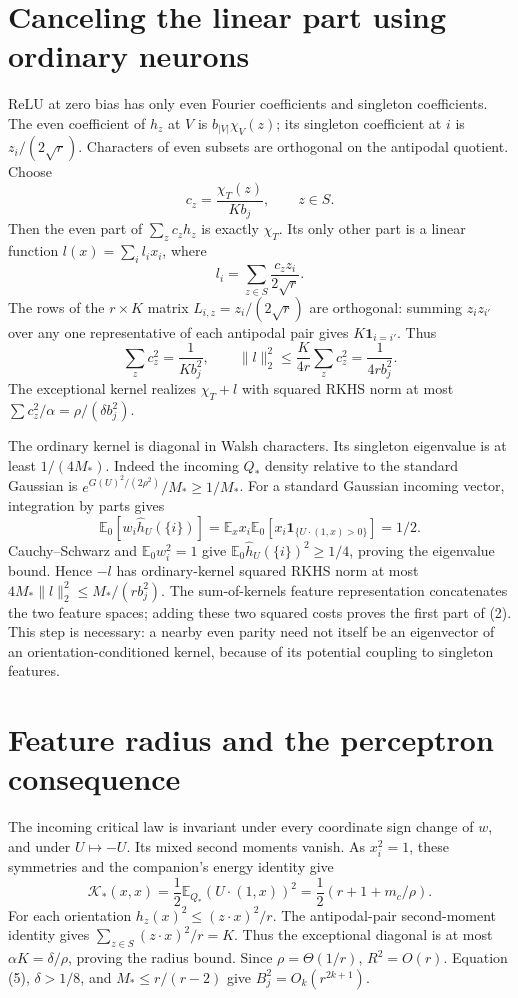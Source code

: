\documentclass[11pt]{article}
\newcommand{\E}{\mathbb E}\newcommand{\R}{\mathbb R}
\begin{document}
\section{Canceling the linear part using ordinary neurons}
ReLU at zero bias has only even Fourier coefficients and singleton
coefficients. The even coefficient of $h_z$ at $V$ is
$b_{|V|}\chi_V(z)$; its singleton coefficient at $i$ is $z_i/(2\sqrt r)$.
Characters of even subsets are orthogonal on the antipodal quotient.
Choose
\[
 c_z=\frac{\chi_T(z)}{K b_j},\qquad z\in S.
\]
Then the even part of $\sum_zc_zh_z$ is exactly $\chi_T$. Its only
other part is a linear function $l(x)=\sum_i l_ix_i$, where
\[
 l_i=\sum_{z\in S}\frac{c_zz_i}{2\sqrt r}.
\]
The rows of the $r\times K$ matrix $L_{i,z}=z_i/(2\sqrt r)$ are
orthogonal: summing $z_i z_{i'}$ over any one representative of each
antipodal pair gives $K\mathbf1_{i=i'}$. Thus
\[
 \sum_zc_z^2=\frac1{Kb_j^2},\qquad
 \|l\|_2^2\le\frac{K}{4r}\sum_zc_z^2=\frac1{4r b_j^2}.   \tag{6}
\]
The exceptional kernel realizes $\chi_T+l$ with squared RKHS norm
at most $\sum c_z^2/\alpha=\rho/(\delta b_j^2)$.

The ordinary kernel is diagonal in Walsh characters. Its singleton
eigenvalue is at least $1/(4M_*)$. Indeed the incoming $Q_*$ density
relative to the standard Gaussian is $e^{G(U)^2/(2\rho^2)}/M_*\ge1/M_*$.
For a standard Gaussian incoming vector, integration by parts gives
\[
 \E_0[w_i\widehat h_U(\{i\})]
 =\E_x x_i\E_0[x_i\mathbf1_{\{U\cdot(1,x)>0\}}]=1/2.
\]
Cauchy--Schwarz and $\E_0 w_i^2=1$ give
$\E_0\widehat h_U(\{i\})^2\ge1/4$, proving the eigenvalue bound.
Hence $-l$ has ordinary-kernel squared RKHS norm at most
$4M_*\|l\|_2^2\le M_*/(r b_j^2)$.
The sum-of-kernels feature representation concatenates the two feature
spaces; adding these two squared costs proves the first part of (2).
This step is necessary: a nearby even parity need not itself be an
eigenvector of an orientation-conditioned kernel, because of its
potential coupling to singleton features.

\section{Feature radius and the perceptron consequence}
The incoming critical law is invariant under every coordinate sign
change of $w$, and under $U\mapsto-U$. Its mixed second moments vanish.
As $x_i^2=1$, these symmetries and the companion's energy identity give
\[
 \mathcal K_*(x,x)=\frac12\E_{Q_*}(U\cdot(1,x))^2
                 =\frac12(r+1+m_c/\rho).
\]
For each orientation $h_z(x)^2\le(z\cdot x)^2/r$.
The antipodal-pair second-moment identity gives
$\sum_{z\in S}(z\cdot x)^2/r=K$. Thus the exceptional diagonal is
at most $\alpha K=\delta/\rho$, proving the radius bound.
Since $\rho=\Theta(1/r)$, $R^2=O(r)$. Equation (5), $\delta>1/8$,
and $M_*\le r/(r-2)$ give $B_j^2=O_k(r^{2k+1})$.
\end{document}
